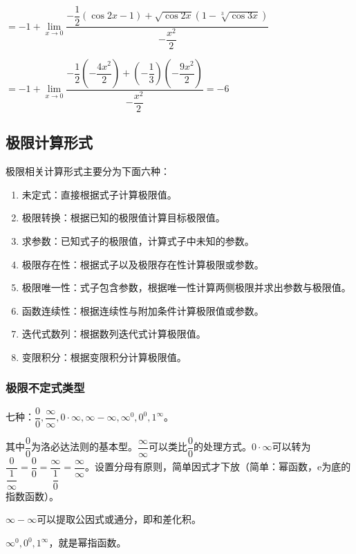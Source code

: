 \documentclass[UTF8, 12pt]{ctexart}
\begin{document}
$=-1+\lim\limits_{x\to 0}\dfrac{-\dfrac{1}{2}(\cos 2x-1)+\sqrt{\cos 2x}(1-\sqrt[3]{\cos 3x})}{-\dfrac{x^2}{2}}$

$=-1+\lim\limits_{x\to 0}\dfrac{-\dfrac{1}{2}(-\dfrac{4x^2}{2})+\left(-\dfrac{1}{3}\right)\left(-\dfrac{9x^2}{2}\right)}{-\dfrac{x^2}{2}}=-6$

\subsection{极限计算形式}

极限相关计算形式主要分为下面六种：

\begin{enumerate}
    \item 未定式：直接根据式子计算极限值。
    \item 极限转换：根据已知的极限值计算目标极限值。
    \item 求参数：已知式子的极限值，计算式子中未知的参数。
    \item 极限存在性：根据式子以及极限存在性计算极限或参数。
    \item 极限唯一性：式子包含参数，根据唯一性计算两侧极限并求出参数与极限值。
    \item 函数连续性：根据连续性与附加条件计算极限值或参数。
    \item 迭代式数列：根据数列迭代式计算极限值。
    \item 变限积分：根据变限积分计算极限值。
\end{enumerate}

\subsubsection{极限不定式类型}

七种：$\dfrac{0}{0},\dfrac{\infty}{\infty},0\cdot\infty,\infty-\infty,\infty^0,0^0,1^\infty$。

\medskip

其中$\dfrac{0}{0}$为洛必达法则的基本型。$\dfrac{\infty}{\infty}$可以类比$\dfrac{0}{0}$的处理方式。$0\cdot\infty$可以转为$\dfrac{0}{\dfrac{1}{\infty}}=\dfrac{0}{0}=\dfrac{\infty}{\dfrac{1}{0}}=\dfrac{\infty}{\infty}$。设置分母有原则，简单因式才下放（简单：幂函数，e为底的指数函数）。 

$\infty-\infty$可以提取公因式或通分，即和差化积。

\medskip

$\infty^0,0^0,1^\infty$，就是幂指函数。

\medskip
\end{document}
